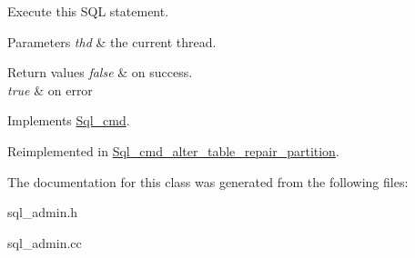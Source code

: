 Execute this S\+QL statement. 
\begin{DoxyParams}{Parameters}
{\em thd} & the current thread. \\
\hline
\end{DoxyParams}

\begin{DoxyRetVals}{Return values}
{\em false} & on success. \\
\hline
{\em true} & on error \\
\hline
\end{DoxyRetVals}


Implements \mbox{\hyperlink{classSql__cmd_a213367b79b551296fbb7790f2a3732fb}{Sql\+\_\+cmd}}.



Reimplemented in \mbox{\hyperlink{classSql__cmd__alter__table__repair__partition_a48d4d8c83b4d7c15b0f6232eae9dfe5a}{Sql\+\_\+cmd\+\_\+alter\+\_\+table\+\_\+repair\+\_\+partition}}.



The documentation for this class was generated from the following files\+:\begin{DoxyCompactItemize}
\item 
sql\+\_\+admin.\+h\item 
sql\+\_\+admin.\+cc\end{DoxyCompactItemize}
